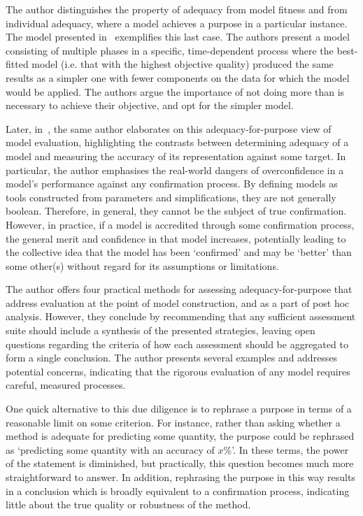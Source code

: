The author distinguishes the property of adequacy from model fitness and from
individual adequacy, where a model achieves a purpose in a particular instance.
The model presented in~\cite{Knight2012} exemplifies this last case. The authors
present a model consisting of multiple phases in a specific, time-dependent
process where the best-fitted model (i.e. that with the highest objective
quality) produced the same results as a simpler one with fewer components on the
data for which the model would be applied. The authors argue the importance of
not doing more than is necessary to achieve their objective, and opt for the
simpler model.

Later, in~\cite{Parker2020}, the same author elaborates on this
adequacy-for-purpose view of model evaluation, highlighting the contrasts
between determining adequacy of a model and measuring the accuracy of its
representation against some target. In particular, the author emphasises the
real-world dangers of overconfidence in a model's performance against any
confirmation process. By defining models as tools constructed from parameters
and simplifications, they are not generally boolean. Therefore, in general, they
cannot be the subject of true confirmation. However, in practice, if a model is
accredited through some confirmation process, the general merit and confidence
in that model increases, potentially leading to the collective idea that the
model has been `confirmed' and may be `better' than some other(s) without regard
for its assumptions or limitations.

The author offers four practical methods for assessing adequacy-for-purpose that
address evaluation at the point of model construction, and as a part of post hoc
analysis. However, they conclude by recommending that any sufficient assessment
suite should include a synthesis of the presented strategies, leaving open
questions regarding the criteria of how each assessment should be aggregated to
form a single conclusion. The author presents several examples and addresses
potential concerns, indicating that the rigorous evaluation of any model
requires careful, measured processes.

One quick alternative to this due diligence is to rephrase a purpose in terms of
a reasonable limit on some criterion. For instance, rather than asking whether a
method is adequate for predicting some quantity, the purpose could be rephrased
as `predicting some quantity with an accuracy of \(x\)\%'. In these terms, the
power of the statement is diminished, but practically, this question becomes
much more straightforward to answer. In addition, rephrasing the purpose in this
way results in a conclusion which is broadly equivalent to a confirmation
process, indicating little about the true quality or robustness of the method.

